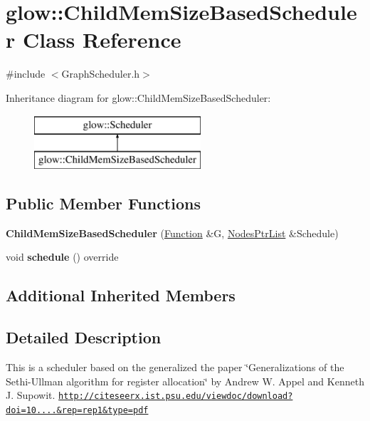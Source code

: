 \hypertarget{classglow_1_1_child_mem_size_based_scheduler}{}\section{glow\+:\+:Child\+Mem\+Size\+Based\+Scheduler Class Reference}
\label{classglow_1_1_child_mem_size_based_scheduler}


{\ttfamily \#include $<$Graph\+Scheduler.\+h$>$}

Inheritance diagram for glow\+:\+:Child\+Mem\+Size\+Based\+Scheduler\+:\begin{figure}[H]
\begin{center}
\leavevmode
\includegraphics[height=2.000000cm]{classglow_1_1_child_mem_size_based_scheduler}
\end{center}
\end{figure}
\subsection*{Public Member Functions}
\begin{DoxyCompactItemize}
\item 
\mbox{\label{classglow_1_1_child_mem_size_based_scheduler_aaadb4f4fa4fa89adeda6a87d4c8df6c0}} 
{\bfseries Child\+Mem\+Size\+Based\+Scheduler} (\hyperlink{classglow_1_1_function}{Function} \&G, \hyperlink{namespaceglow_a40ec79a2f9c485bfa999ed31fd0854dd}{Nodes\+Ptr\+List} \&Schedule)
\item 
\mbox{\label{classglow_1_1_child_mem_size_based_scheduler_a8a3a6c05ed31c6e317e15b03a607cbe1}} 
void {\bfseries schedule} () override
\end{DoxyCompactItemize}
\subsection*{Additional Inherited Members}


\subsection{Detailed Description}
This is a scheduler based on the generalized the paper \char`\"{}\+Generalizations of
the Sethi-\/\+Ullman algorithm for register allocation\char`\"{} by Andrew W. Appel and Kenneth J. Supowit. \href{http://citeseerx.ist.psu.edu/viewdoc/download?doi=10.1.1.54.319&rep=rep1&type=pdf}{\tt http\+://citeseerx.\+ist.\+psu.\+edu/viewdoc/download?doi=10....\&rep=rep1\&type=pdf}

